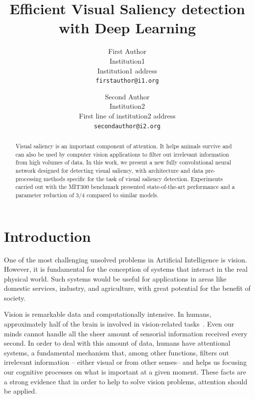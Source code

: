 \documentclass[journal]{IEEEtran}
\begin{document}
\title{Efficient Visual Saliency detection with Deep Learning}

\author{First Author\\
Institution1\\
Institution1 address\\
{\tt\small firstauthor@i1.org}
\and
Second Author\\
Institution2\\
First line of institution2 address\\
{\tt\small secondauthor@i2.org}
}

\maketitle

\begin{abstract}
Visual saliency is an important component of attention.
It helps animals survive and can also be used by computer vision applications
to filter out irrelevant information from high volumes of data.
In this work, we present a new fully convolutional neural network
designed for detecting visual saliency,
with architecture and data pre-processing methods specific
for the task of visual saliency detection.
Experiments carried out with the MIT300 benchmark presented state-of-the-art
performance and a parameter reduction of 3/4 compared to similar models.
\end{abstract}

\section{Introduction}
One of the most challenging unsolved problems in Artificial Intelligence
is vision.
However, it is fundamental for the conception of systems that interact
in the real physical world.
Such systems would be useful for applications in areas like
domestic services, industry, and agriculture,
with great potential for the benefit of society.

Vision is remarkable data and computationally intensive.
In humans, approximately half of the brain is involved in
vision-related tasks~\cite{fixott_1957}.
Even our minds cannot handle all the sheer amount of sensorial information
received every second. In order to deal with this amount of data,
humans have attentional systems, a fundamental mechanism
that, among other functions, filters out irrelevant information
-- either visual or from other senses-- and helps us focusing our cognitive
processes on what is important at a given moment.
These facts are a strong evidence that in order to help to solve
vision problems, attention should be applied.
\end{document}
